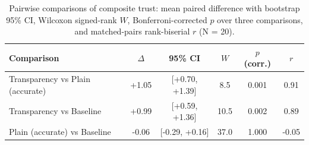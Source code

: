 \begin{table}[H]
\centering
\caption{Pairwise comparisons of composite trust: mean paired difference with bootstrap 95\% CI, Wilcoxon signed-rank $W$, Bonferroni-corrected $p$ over three comparisons, and matched-pairs rank-biserial $r$ (N = 20).}
\label{tab:us-pairwise}
{\footnotesize{}\setlength{\tabcolsep}{4pt}
\begin{tabular}{lccccc}
\toprule
\textbf{Comparison} & \textbf{$\Delta$} & \textbf{95\% CI} & \textbf{$W$} & \textbf{$p$ (corr.)} & \textbf{$r$} \\
\midrule
Transparency vs Plain (accurate) & +1.05 & [+0.70, +1.39] & 8.5 & 0.001 & 0.91 \\
Transparency vs Baseline & +0.99 & [+0.59, +1.36] & 10.5 & 0.002 & 0.89 \\
Plain (accurate) vs Baseline & -0.06 & [-0.29, +0.16] & 37.0 & 1.000 & -0.05 \\
\bottomrule
\end{tabular}
}
\end{table}
